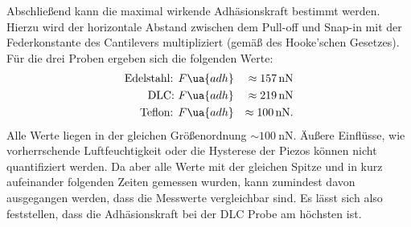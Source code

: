 Abschließend kann die maximal wirkende Adhäsionskraft bestimmt werden. Hierzu wird der horizontale
Abstand zwischen dem Pull-off und Snap-in mit der Federkonstante des Cantilevers multipliziert (gemäß des Hooke'schen Gesetzes).
Für die drei Proben ergeben sich die folgenden Werte:
\begin{align}
  \begin{aligned}
    \text{Edelstahl: } & F\ua{adh} &\approx \SI{157}{\nano\newton}\\
    \text{DLC: } & F\ua{adh}       &\approx \SI{219}{\nano\newton}\\
    \text{Teflon: } & F\ua{adh}    &\approx \SI{100}{\nano\newton}.
  \end{aligned}
\end{align}
Alle Werte liegen in der gleichen Größenordnung $\sim \SI{100}{\nano\newton}$. Äußere Einflüsse, wie vorherrschende Luftfeuchtigkeit
oder die Hysterese der Piezos können nicht quantifiziert werden. Da aber alle Werte mit der gleichen Spitze und in kurz aufeinander
folgenden Zeiten gemessen wurden, kann zumindest davon ausgegangen werden, dass die Messwerte vergleichbar sind. Es lässt sich also feststellen, dass die
Adhäsionskraft bei der DLC Probe am höchsten ist.
\FloatBarrier
